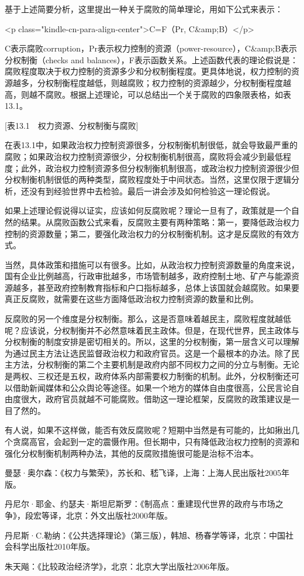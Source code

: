 基于上述简要分析，这里提出一种关于腐败的简单理论，用如下公式来表示：

<p class="kindle-cn-para-align-center">C=F（Pr, C&amp;B）</p>

C表示腐败corruption，Pr表示权力控制的资源（power-resource），C&amp;B表示分权制衡（checks and balances），F表示函数关系。上述函数代表的理论假说是：腐败程度取决于权力控制的资源多少和分权制衡程度。更具体地说，权力控制的资源越多，分权制衡程度越低，则越腐败；权力控制的资源越少，分权制衡程度越高，则越不腐败。根据上述理论，可以总结出一个关于腐败的四象限表格，如表13.1。

[表13.1　权力资源、分权制衡与腐败]

在表13.1中，如果政治权力控制资源很多，分权制衡机制很低，就会导致最严重的腐败；如果政治权力控制资源很少，分权制衡机制很高，腐败将会减少到最低程度；此外，政治权力控制资源多但分权制衡机制很高，或政治权力控制资源很少但分权制衡机制很低的两种类型，腐败程度处于中间状态。当然，这里仅限于逻辑分析，还没有到经验世界中去检验。最后一讲会涉及如何检验这一理论假说。

如果上述理论假说得以证实，应该如何反腐败呢？理论一旦有了，政策就是一个自然的结果。从腐败函数公式来看，反腐败主要有两种策略：第一，要降低政治权力控制的资源数量；第二，要强化政治权力的分权制衡机制。这才是反腐败的有效方式。

当然，具体政策和措施可以有很多。比如，从政治权力控制资源数量的角度来说，国有企业比例越高，行政审批越多，市场管制越多，政府控制土地、矿产与能源资源越多，甚至政府控制教育指标和户口指标越多，总体上该国就会越腐败。如果要真正反腐败，就需要在这些方面降低政治权力控制资源的数量和比例。

反腐败的另一个维度是分权制衡。那么，这是否意味着越民主，腐败程度就越低呢？应该说，分权制衡并不必然意味着民主政体。但是，在现代世界，民主政体与分权制衡的制度安排是密切相关的。所以，这里的分权制衡，第一层含义可以理解为通过民主方法让选民监督政治权力和政府官员。这是一个最根本的办法。除了民主方法，分权制衡的第二个主要机制是政府内部不同权力之间的分立与制衡。无论是两权、三权还是五权，政府体系内部需要权力制衡的机制。此外，分权制衡还可以借助新闻媒体和公众舆论等途径。如果一个地方的媒体自由度很高，公民言论自由度很大，政府官员就越不可能腐败。借助这一理论框架，反腐败的政策建议是一目了然的。

有人说，如果不这样做，能否有效反腐败呢？短期中当然是有可能的，比如揪出几个贪腐高官，会起到一定的震慑作用。但长期中，只有降低政治权力控制的资源和强化分权制衡机制两种办法，其他的反腐败措施很可能是治标不治本。


曼瑟·奥尔森：《权力与繁荣》，苏长和、嵇飞译，上海：上海人民出版社2005年版。

丹尼尔·耶金、约瑟夫·斯坦尼斯罗：《制高点：重建现代世界的政府与市场之争》，段宏等译，北京：外文出版社2000年版。

丹尼斯·C.勒纳：《公共选择理论》（第三版），韩旭、杨春学等译，北京：中国社会科学出版社2010年版。

朱天飚：《比较政治经济学》，北京：北京大学出版社2006年版。
